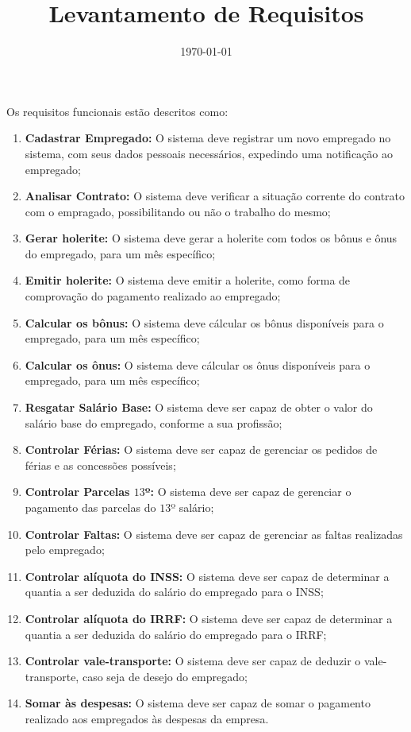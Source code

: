 \documentclass [12pt]{article}
\title {Levantamento de Requisitos}
\date {\today}
\begin{document}
	\inserirTitulo
	
	Os requisitos funcionais estão descritos como:
	
	\begin{enumerate}
		\item \textbf{Cadastrar Empregado:} O sistema deve registrar um novo empregado no sistema, com seus dados pessoais necessários, expedindo uma notificação ao empregado;
		\item \textbf{Analisar Contrato:} O sistema deve verificar a situação corrente do contrato com o empragado, possibilitando ou não o trabalho do mesmo;
		\item \textbf{Gerar holerite:} O sistema deve gerar a holerite com todos os bônus e ônus do empregado, para um mês específico;
		\item \textbf{Emitir holerite:} O sistema deve emitir a holerite, como forma de comprovação do pagamento realizado ao empregado;
		\item \textbf{Calcular os bônus:} O sistema deve cálcular os bônus disponíveis para o empregado, para um mês específico;
		\item \textbf{Calcular os ônus:} O sistema deve cálcular os ônus disponíveis para o empregado, para um mês específico;
		\item \textbf{Resgatar Salário Base:} O sistema deve ser capaz de obter o valor do salário base do empregado, conforme a sua profissão;
		\item \textbf{Controlar Férias:} O sistema deve ser capaz de gerenciar os pedidos de férias e as concessões possíveis;
		\item \textbf{Controlar Parcelas $13$º:} O sistema deve ser capaz de gerenciar o pagamento das parcelas do $13$º salário;
		\item \textbf{Controlar Faltas:} O sistema deve ser capaz de gerenciar as faltas realizadas pelo empregado;
		\item \textbf{Controlar alíquota do INSS:} O sistema deve ser capaz de determinar a quantia a ser deduzida do salário do empregado para o INSS;
		\item \textbf{Controlar alíquota do IRRF:} O sistema deve ser capaz de determinar a quantia a ser deduzida do salário do empregado para o IRRF;
		\item \textbf{Controlar vale-transporte:} O sistema deve ser capaz de deduzir o vale-transporte, caso seja de desejo do empregado;
		\item \textbf{Somar às despesas:} O sistema deve ser capaz de somar o pagamento realizado aos empregados às despesas da empresa.
	\end{enumerate}
	
\end{document}
